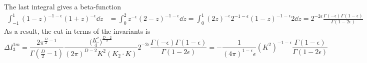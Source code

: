 %
The last integral gives a beta-function
%
\begin{equation*}
\begin{split}
\int^1_{-1} (1-z)^{-1-\epsilon}(1+z)^{-\epsilon} \dd z & = 
\int^2_{0} z^{-\epsilon}(2-z)^{-1-\epsilon} \dd z 
=\int^1_0(2z)^{-\epsilon} 2^{-1-\epsilon} (1-z)^{-1-\epsilon} 2 \dd z
=2^{-2\epsilon}\frac{\Gamma(-\epsilon)\Gamma(1-\epsilon)}{\Gamma(1-2\epsilon)}
\end{split}
\end{equation*}
%
As a result, the cut in terms of the invariants is
\begin{equation*}
\Delta I_3^{1m} = 
\frac{2\pi^{\frac{D}{2}-1}}{\Gamma(\frac{D}{2}-1)}\frac{\big(\frac{K^2}{4}\big)^{\frac{D-2}{2}}}{(2\pi)^{D-2}K^2(K_2\cdot K)} 2^{-2\epsilon}\frac{\Gamma(-\epsilon)\Gamma(1-\epsilon)}{\Gamma(1-2\epsilon)}
=
-\frac{1}{(4\pi)^{1 - \epsilon}\epsilon}(K^{2})^{-1-\epsilon}\frac{\Gamma(1-\epsilon)}{\Gamma(1-2\epsilon)}
\end{equation*}